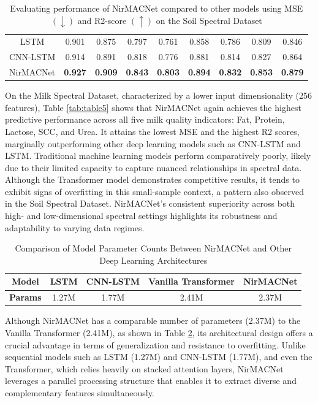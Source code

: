 \documentclass[10pt, a4paper, oneside]{article}
\begin{document}
\begin{table}[!h]
{\begin{tabular}{ccccccccc}
LSTM          & 0.901 & 0.875   & 0.797  & 0.761    & 0.858  & 0.786   & 0.809   & 0.846  \\
CNN-LSTM      & 0.914 & 0.891   & 0.818  & 0.776    & 0.881  & 0.814   & 0.827   & 0.864  \\
NirMACNet     & \textbf{0.927} & \textbf{0.909} & \textbf{0.843} & \textbf{0.803} & \textbf{0.894} & \textbf{0.832} & \textbf{0.853} & \textbf{0.879} \\
\hline
\end{tabular}%
}
\caption{Evaluating performance of NirMACNet compared to other models using MSE $(\downarrow)$ and R2-score $(\uparrow)$ on the Soil Spectral Dataset}\label{tab:table7}
\end{table}

On the Milk Spectral Dataset, characterized by a lower input dimensionality (256 features), Table \ref{tab:table5} shows that NirMACNet again achieves the highest predictive performance across all five milk quality indicators: Fat, Protein, Lactose, SCC, and Urea. It attains the lowest MSE and the highest R2 scores, marginally outperforming other deep learning models such as CNN-LSTM and LSTM. Traditional machine learning models perform comparatively poorly, likely due to their limited capacity to capture nuanced relationships in spectral data. Although the Transformer model demonstrates competitive results, it tends to exhibit signs of overfitting in this small-sample context, a pattern also observed in the Soil Spectral Dataset. NirMACNet’s consistent superiority across both high- and low-dimensional spectral settings highlights its robustness and adaptability to varying data regimes.

\begin{table}[!h]
\centering
\begin{tabular}{ccccc}
\hline
\textbf{Model} & LSTM & CNN-LSTM & Vanilla Transformer & NirMACNet \\
\hline
\textbf{Params} & 1.27M & 1.77M & 2.41M & 2.37M\\
\hline
\end{tabular}
\caption{Comparison of Model Parameter Counts Between NirMACNet and Other Deep Learning Architectures}\label{tab:table8}
\end{table}

Although NirMACNet has a comparable number of parameters (2.37M) to the Vanilla Transformer (2.41M), as shown in Table \ref{tab:table8}, its architectural design offers a crucial advantage in terms of generalization and resistance to overfitting. Unlike sequential models such as LSTM (1.27M) and CNN-LSTM (1.77M), and even the Transformer, which relies heavily on stacked attention layers, NirMACNet leverages a parallel processing structure that enables it to extract diverse and complementary features simultaneously.
\end{document}
